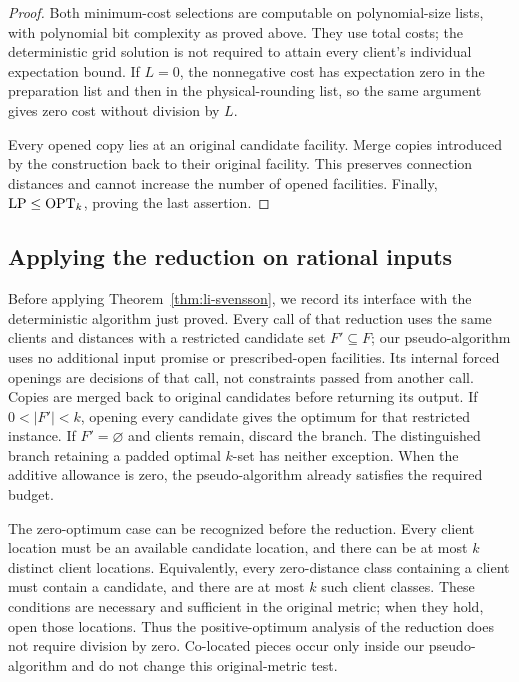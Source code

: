 \begin{proof}
Both minimum-cost selections are computable on polynomial-size
lists, with polynomial bit complexity as proved above. They use
total costs; the deterministic grid solution is not required to
attain every client's individual expectation bound. If \(L=0\),
the nonnegative cost has expectation zero in the preparation list
and then in the physical-rounding list, so the same argument gives
zero cost without division by \(L\).

Every opened copy lies at an original candidate facility. Merge
copies introduced by the construction back to their original
facility. This preserves connection distances and cannot increase
the number of opened facilities. Finally,
\(\operatorname{LP}\le\operatorname{OPT}_k\), proving the last assertion.
\end{proof}

\subsection{Applying the reduction on rational inputs}
\label{sec:reduction-implementation}

Before applying Theorem~\ref{thm:li-svensson}, we record its interface
with the deterministic algorithm just proved. Every call of that reduction
uses the same clients and distances with a restricted candidate set
\(F'\subseteq F\); our pseudo-algorithm uses no additional input promise
or prescribed-open facilities. Its internal forced openings are decisions
of that call, not constraints passed from another call. Copies are merged
back to original candidates before returning its output. If
\(0<|F'|<k\), opening every candidate gives the optimum for that restricted
instance. If \(F'=\varnothing\) and clients remain, discard the branch.
The distinguished branch retaining a padded optimal \(k\)-set has
neither exception. When the additive allowance is zero, the
pseudo-algorithm already satisfies the required budget.

The zero-optimum case can be recognized before the reduction. Every
client location must be an available candidate location, and there can
be at most \(k\) distinct client locations. Equivalently, every
zero-distance class containing a client must contain a candidate, and
there are at most \(k\) such client classes. These conditions are necessary
and sufficient in the original metric; when they hold, open those
locations. Thus the positive-optimum analysis of the reduction does not
require division by zero. Co-located pieces occur only inside our
pseudo-algorithm and do not change this original-metric test.

